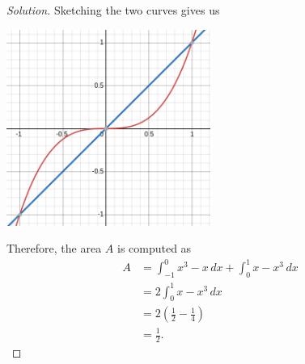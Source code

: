 \documentclass{article}
\theoremstyle{plain}
\theoremstyle{definition}
\begin{document}
\begin{enumerate}
\begin{enumerate}
        \begin{proof}[Solution]
          Sketching the two curves gives us
          \begin{center}
            \includegraphics[width=0.5\textwidth]{problem-6-1-22.png}
          \end{center}
          Therefore, the area $A$ is computed as
          \begin{align}
            A & = \int_{-1}^0 x^3 - x \,dx + \int_0^1 x - x^3\,dx \\
              & = 2 \int_0^1 x - x^3\,dx                          \\
              & = 2\left(\frac{1}{2} - \frac{1}{4}\right)         \\
              & = \frac{1}{2}.
          \end{align}
        \end{proof}
    \end{enumerate}
\end{enumerate}
\end{document}
